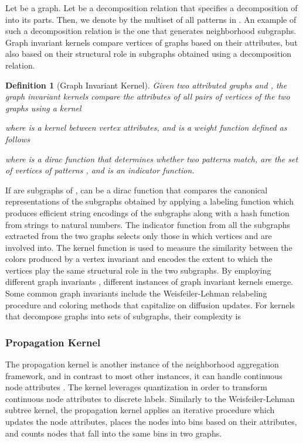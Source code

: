 \documentclass[twoside,11pt]{article}
\newtheorem{definition}{Definition}
\begin{document}
Let  be a graph.
Let  be a decomposition relation that specifies a decomposition of  into its parts.
Then, we denote by  the multiset of all patterns in .
An example of such a decomposition relation is the one that generates neighborhood subgraphs.
Graph invariant kernels compare vertices of graphs based on their attributes, but also based on their  structural role in subgraphs obtained using a decomposition relation.
\begin{definition}[Graph Invariant Kernel]
  Given two attributed graphs  and , the graph invariant kernels compare the attributes of all pairs of vertices of the two graphs using a kernel
  
  where  is a kernel between vertex attributes, and  is a weight function defined as follows
  
  where  is a dirac function that determines whether two patterns match,  are the set of vertices of patterns , and  is an indicator function. 
\end{definition}
If  are subgraphs of ,  can be a dirac function that compares the canonical representations of the subgraphs obtained by applying a labeling function which produces efficient string encodings of the subgraphs along with a hash function from strings to natural numbers.  
The indicator function  from all the subgraphs extracted from the two graphs selects only those in which vertices  and  are involved into.
The kernel function  is used to measure the similarity between the colors produced by a vertex invariant  and encodes the extent to which the vertices play the same structural role in the two subgraphs.
By employing different graph invariants , different instances of graph invariant kernels emerge.
Some common graph invariants include the Weisfeiler-Lehman relabeling procedure and coloring methods that capitalize on diffusion updates.
For kernels that decompose graphs into sets of subgraphs, their complexity is 

\subsubsection{Propagation Kernel}
The propagation kernel is another instance of the neighborhood aggregation framework, and in contrast to most other instances, it can handle continuous node attributes .
The kernel leverages quantization in order to transform continuous node attributes to discrete labels.
Similarly to the Weisfeiler-Lehman subtree kernel, the propagation kernel applies an iterative procedure which updates the node attributes, places the nodes into bins based on their attributes, and counts nodes that fall into the same bins in two graphs. 
\end{document}
